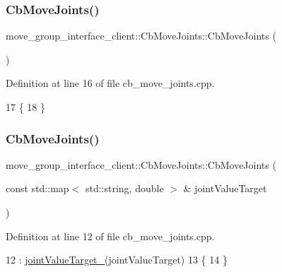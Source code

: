 \subsubsection{\texorpdfstring{Cb\+Move\+Joints()}{CbMoveJoints()}\hspace{0.1cm}{\footnotesize\ttfamily [1/2]}}
{\footnotesize\ttfamily move\+\_\+group\+\_\+interface\+\_\+client\+::\+Cb\+Move\+Joints\+::\+Cb\+Move\+Joints (\begin{DoxyParamCaption}{ }\end{DoxyParamCaption})}



Definition at line 16 of file cb\+\_\+move\+\_\+joints.\+cpp.


\begin{DoxyCode}
17   \{
18   \}
\end{DoxyCode}
\mbox{\label{classmove__group__interface__client_1_1CbMoveJoints_a0481527a72230d2399f08cf2f61d9c34}} 
\subsubsection{\texorpdfstring{Cb\+Move\+Joints()}{CbMoveJoints()}\hspace{0.1cm}{\footnotesize\ttfamily [2/2]}}
{\footnotesize\ttfamily move\+\_\+group\+\_\+interface\+\_\+client\+::\+Cb\+Move\+Joints\+::\+Cb\+Move\+Joints (\begin{DoxyParamCaption}\item[{const std\+::map$<$ std\+::string, double $>$ \&}]{joint\+Value\+Target }\end{DoxyParamCaption})}



Definition at line 12 of file cb\+\_\+move\+\_\+joints.\+cpp.


\begin{DoxyCode}
12                                                                               : 
      \hyperlink{classmove__group__interface__client_1_1CbMoveJoints_a7339a7f34ba2c481b6a0821db5f1a483}{jointValueTarget\_}(jointValueTarget)
13   \{
14   \}
\end{DoxyCode}



